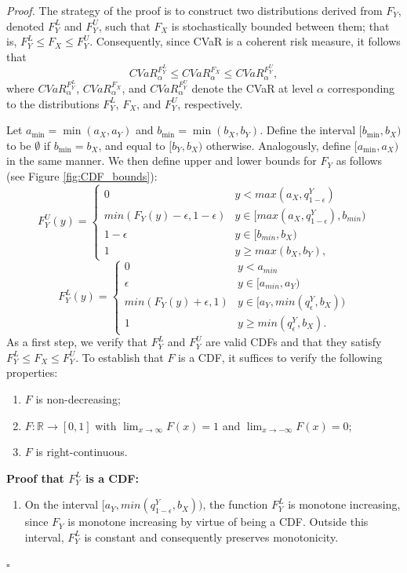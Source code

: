 \documentclass[letterpaper]{article} %
\newenvironment{proof}{\noindent\textit{Proof.}}{\hfill$\square$}
\begin{document}
\begin{proof}
	The strategy of the proof is to construct two distributions derived from $F_Y$, denoted $F_Y^L$ and $F_Y^U$, such that $F_X$ is stochastically bounded between them; that is, $F_Y^L \leq F_X \leq F_Y^U$. Consequently, since CVaR is a coherent risk measure, it follows that
	\begin{equation}
		CVaR_\alpha^{F_Y^L} \leq CVaR_\alpha^{F_X} \leq CVaR_\alpha^{F_Y^U},
	\end{equation}
	where $CVaR_\alpha^{F_Y^L}$, $CVaR_\alpha^{F_X}$, and $CVaR_\alpha^{F_Y^U}$ denote the CVaR at level $\alpha$ corresponding to the distributions $F_Y^L$, $F_X$, and $F_Y^U$, respectively.
	
	Let $a_{\min} = \min(a_X, a_Y)$ and $b_{\min} = \min(b_X, b_Y)$. Define the interval $[b_{\min}, b_X)$ to be $\emptyset$ if $b_{\min} = b_X$, and equal to $[b_Y, b_X)$ otherwise. Analogously, define $[a_{\min}, a_X)$ in the same manner. We then define upper and lower bounds for $F_Y$ as follows (see Figure \ref{fig:CDF_bounds}): \begin{equation}
		F_Y^U(y)=\begin{cases}
			0 & y< max(a_X,q_{1-\epsilon}^Y) \\
			min(F_Y(y)-\epsilon, 1-\epsilon) & y\in [max(a_X,q_{1-\epsilon}^Y), b_{min}) \\
			1-\epsilon & y\in [b_{min}, b_X) \\
			1 & y\geq max(b_X, b_Y),
		\end{cases}
	\end{equation}
	\begin{equation}
		F_Y^L(y)=\begin{cases}
			0 & y<a_{min}  \\
			\epsilon & y\in [a_{min}, a_Y) \\
			min(F_Y(y)+\epsilon, 1) & y\in [a_Y, min(q_{\epsilon}^Y, b_X)) \\
			1 & y\geq min(q_\epsilon^Y, b_X).
		\end{cases}
	\end{equation}
	As a first step, we verify that $F_Y^L$ and $F_Y^U$ are valid CDFs and that they satisfy $F_Y^L \leq F_X \leq F_Y^U$. To establish that $F$ is a CDF, it suffices to verify the following properties:
	\begin{enumerate}
		\item $F$ is non-decreasing;
		\item $F : \mathbb{R} \to [0,1]$ with $\lim_{x \to \infty} F(x) = 1$ and $\lim_{x \to -\infty} F(x) = 0$;
		\item $F$ is right-continuous.
	\end{enumerate}
	\textbf{Proof that $F_Y^L$ is a CDF:} \begin{enumerate}
		\item On the interval $[a_Y, min(q_{1-\epsilon}^Y, b_X))$, the function $F_Y^L$ is monotone increasing, since $F_Y$ is monotone increasing by virtue of being a CDF. Outside this interval, $F_Y^L$ is constant and consequently preserves monotonicity.
		

\end{enumerate}
\end{proof}
\end{document}
